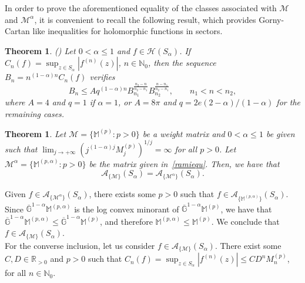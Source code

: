 \documentclass[11pt,a4paper]{article}
\theoremstyle{plain}
\newtheorem{theorem}[proposition]{Theorem}
\theoremstyle{definition}
\newcommand{\RR}{\mathbb{R}}
\newcommand{\NN}{\mathbb{N}}
\newcommand{\M}{\mathbb{M}}
\newcommand{\G}{\mathbb{G}}
\def\a{\alpha}
\begin{document}
In order to prove the aforementioned equality of the classes associated with $\mathcal{M}$ and $\mathcal{M}^{\a}$, it is convenient to recall the following result, {which provides Gorny-Cartan like inequalities for holomorphic functions in sectors.}

\begin{theorem}\label{Gornycartan} (\cite[Thm. 23]{salinas62}) Let $0<\alpha\leq1$ and $f\in \mathcal{H}(S_\alpha)$. If
	$C_n(f)=\sup_{z\in S_\alpha}|f^{(n)}(z)|$, $n\in\NN_0$,
	then the sequence $B_n=n^{(1-\alpha)n}C_n(f)$ verifies
	\begin{equation*}%
		B_n\leq A q^{(1-\alpha)n}B_{n_1}^{\frac{n_2-n}{n_2-n_1}}B_{n_2}^{\frac{n-n_1}{n_2-n_1}},\qquad n_1< n < n_2,
	\end{equation*}
	where $A=4$ and $q=1$ if $\alpha=1$, or $A=8\pi$ and $q=2e(2-\alpha)/(1-\alpha)$ for the remaining cases.
\end{theorem}

\begin{theorem}\label{classequality} Let $\mathcal{M}=\{\M^{(p)}: p>0\}$ be a weight matrix and $0<\alpha\le 1$ be given such that $\lim_{j\rightarrow+\infty}(j^{(1-\alpha)j}M^{(p)}_j)^{1/j}=\infty$ for all $p>0$. Let $\mathcal{M}^\alpha=\{\M^{(p,\alpha)}: p>0\}$ be the matrix given in~\eqref{ramiequ}. Then, we have that
$$
\mathcal{A}_{\{\mathcal{M}\}}(S_{\alpha})= \mathcal{A}_{\{\mathcal{M}^\alpha\}}(S_{\alpha}).
$$	
\end{theorem}
Given $f\in\mathcal{A}_{\{\mathcal{M}^\alpha\}}(S_{\alpha})$, there exists some $p>0$ such that $f\in \mathcal{A}_{\{\M^{(p,\alpha)}\}}(S_{\alpha})$. Since $\overline{\G}^{1-\alpha}\M^{(p,\alpha)}$ is the log convex minorant of $\overline{\G}^{1-\alpha}\M^{(p)}$, we have that $\overline{\G}^{1-\alpha}\M^{(p,\alpha)}\leq\overline{\G}^{1-\alpha}\M^{(p)}$, and therefore $\M^{(p,\alpha)}\leq\M^{(p)}$. We conclude that $f\in \mathcal{A}_{\{\mathcal{M}\}}(S_{\alpha})$.\\
For the converse inclusion, let us consider $f\in\mathcal{A}_{\{\mathcal{M}\}}(S_{\alpha})$. There exist some $C,D\in\RR_{>0}$ and $p>0$ such that $C_n(f)=\sup_{z\in S_\alpha}|f^{(n)}(z)|\leq C D^n M_n^{(p)}$, for all $n\in\NN_0$.
\end{document}
